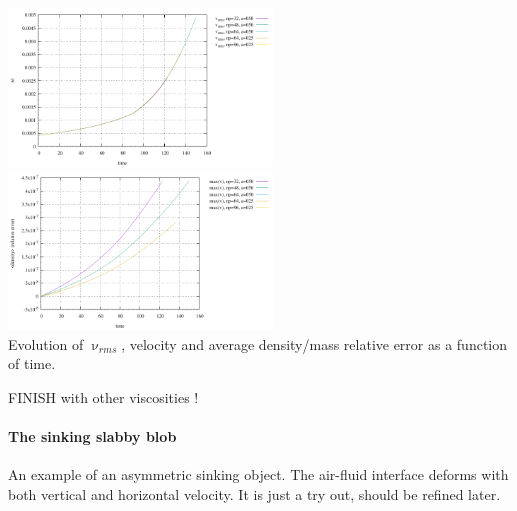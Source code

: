\begin{center}
\includegraphics[width=7cm]{python_codes/fieldstone_93/results_exp4/vel_time}
\includegraphics[width=7cm]{python_codes/fieldstone_93/results_exp4/avrg_rho_time}\\
{\captionfont Evolution of $\upnu_{rms}$, velocity and average density/mass relative
error as a function of time.}
\end{center} 


FINISH with other viscosities !


\newpage
\paragraph{The sinking slabby blob}

An example of an asymmetric sinking object. The air-fluid interface deforms 
with both vertical and horizontal velocity. It is just a try out, should be refined later.

